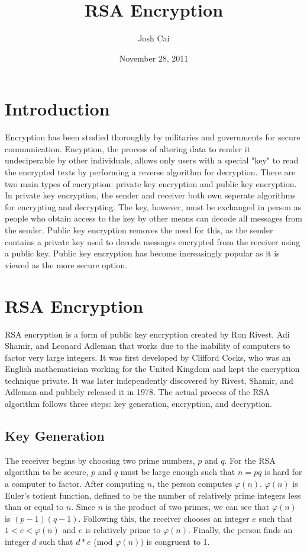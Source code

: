 \documentclass[12pt]{article}
\title{RSA Encryption}
\author{Josh Cai}
\date{November 28, 2011}
\begin{document}
\maketitle
\section{Introduction}
Encryption has been studied thoroughly by militaries and governments for secure communication. Encyption, the process of altering data to render it undeciperable by other individuals, allows only users with a special "key" to read the encrypted texts by performing a reverse algorithm for decryption. There are two main types of encryption: private key encryption and public key encryption. In private key encryption, the sender and receiver both own seperate algorithms for encrypting and decrypting. The key, however, must be exchanged in person as people who obtain access to the key by other means can decode all messages from the sender. Public key encryption removes the need for this, as the sender contains a private key used to decode messages encrypted from the receiver using a public key. Public key encryption has become increasingly popular as it is viewed as the more secure option.

\section{RSA Encryption}
RSA encryption is a form of public key encryption created by Ron Rivest, Adi Shamir, and Leonard Adleman that works due to the inability of computers to factor very large integers. It was first developed by Clifford Cocks, who was an English mathematician working for the United Kingdom and kept the encryption technique private. It was later independently discovered by Rivest, Shamir, and Adleman and publicly released it in 1978. The actual process of the RSA algorithm follows three steps: key generation, encryption, and decryption. 
\subsection{Key Generation}
The receiver begins by choosing two prime numbers, $p$ and $q$. For the RSA algorithm to be secure, $p$ and $q$ must be large enough such that $n = pq$ is hard for a computer to factor. After computing $n$, the person computes $\varphi(n)$. $\varphi(n)$ is Euler's totient function, defined to be the number of relatively prime integers less than or equal to $n$. Since $n$ is the product of two primes, we can see that $\varphi(n)$ is $(p-1)(q-1)$. Following this, the receiver chooses an integer $e$ such that $1<e<\varphi(n)$ and $e$ is relatively prime to $\varphi(n)$. Finally, the person finds an integer $d$ such that $d*e$ (mod $\varphi(n))$ is congruent to 1. 
\end{document}
